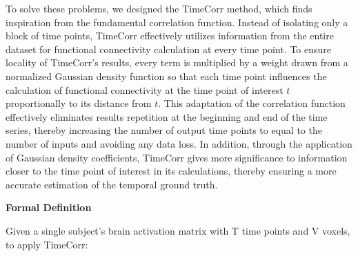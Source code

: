 \documentclass[11pt]{article}
\begin{document}
To solve these problems, we designed the TimeCorr method, which finds inspiration from the fundamental correlation function. Instead of isolating only a block of time points, TimeCorr effectively utilizes information from the entire dataset for functional connectivity calculation at every time point. To ensure locality of TimeCorr's results, every term is multiplied by a weight drawn from a normalized Gaussian density function so that each time point influences the calculation of functional connectivity at the time point of interest $t$ proportionally to its distance from $t$. This adaptation of the correlation function effectively eliminates results repetition at the beginning and end of the time series, thereby increasing the number of output time points to equal to the number of inputs and avoiding any data loss. In addition, through the application of Gaussian density coefficients, TimeCorr gives more significance to information closer to the time point of interest in its calculations, thereby ensuring a more accurate estimation of the temporal ground truth.

\large{\textbf{Formal Definition}}

\normalsize
Given a single subject's brain activation matrix with T time points and V voxels, to apply TimeCorr:
\end{document}
